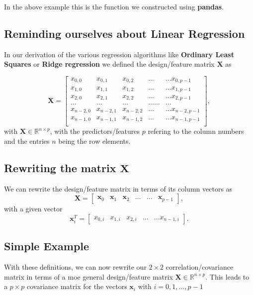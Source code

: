 \documentclass[%
oneside,                 %
final,                   %
10pt]{article}
\begin{document}
In the above example this is the function we constructed using \textbf{pandas}.

\subsection{Reminding ourselves about Linear Regression}
In our derivation of the various regression algorithms like \textbf{Ordinary Least Squares} or \textbf{Ridge regression}
we defined the design/feature matrix $\bm{X}$ as

\[
\bm{X}=\begin{bmatrix}
x_{0,0} & x_{0,1} & x_{0,2}& \dots & \dots x_{0,p-1}\\
x_{1,0} & x_{1,1} & x_{1,2}& \dots & \dots x_{1,p-1}\\
x_{2,0} & x_{2,1} & x_{2,2}& \dots & \dots x_{2,p-1}\\
\dots & \dots & \dots & \dots \dots & \dots \\
x_{n-2,0} & x_{n-2,1} & x_{n-2,2}& \dots & \dots x_{n-2,p-1}\\
x_{n-1,0} & x_{n-1,1} & x_{n-1,2}& \dots & \dots x_{n-1,p-1}\\
\end{bmatrix},
\]
with $\bm{X}\in {\mathbb{R}}^{n\times p}$, with the predictors/features $p$  refering to the column numbers and the
entries $n$ being the row elements.

\subsection{Rewriting the matrix $\bm{X}$}

We can rewrite the design/feature matrix in terms of its column vectors as
\[
\bm{X}=\begin{bmatrix} \bm{x}_0 & \bm{x}_1 & \bm{x}_2 & \dots & \dots & \bm{x}_{p-1}\end{bmatrix},
\]
with a given vector
\[
\bm{x}_i^T = \begin{bmatrix}x_{0,i} & x_{1,i} & x_{2,i}& \dots & \dots x_{n-1,i}\end{bmatrix}.
\]

\subsection{Simple Example}

With these definitions, we can now rewrite our $2\times 2$
correlation/covariance matrix in terms of a moe general design/feature
matrix $\bm{X}\in {\mathbb{R}}^{n\times p}$. This leads to a $p\times p$
covariance matrix for the vectors $\bm{x}_i$ with $i=0,1,\dots,p-1$
\end{document}
